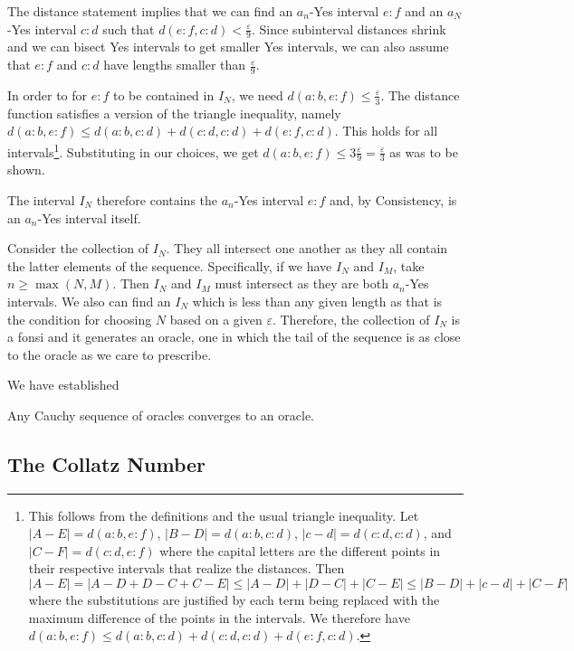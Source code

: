 \documentclass[12pt]{article}
\begin{document}
The distance statement implies that we can find an $a_n$-Yes interval $e:f$ and an $a_N$-Yes interval $c:d$ such that $d(e:f, c:d) < \frac{\varepsilon}{9}$. Since subinterval distances shrink and we can bisect Yes intervals to get smaller Yes intervals, we can also assume that $e:f$ and $c:d$ have lengths smaller than $\frac{\varepsilon}{9}$. 

In order to for $e:f$ to be contained in $I_N$, we need $d(a:b, e:f) \leq \frac{\varepsilon}{3}$. The distance function satisfies a version of the triangle inequality, namely $d(a:b, e:f) \leq d(a:b, c:d) + d(c:d, c:d) + d(e:f, c:d)$. This holds for all intervals\footnote{This follows from the definitions and the usual triangle inequality. Let $|A-E| = d(a:b, e:f)$, $|B-D| = d(a:b, c:d)$, $|c-d| = d(c:d, c:d)$, and $|C-F| = d(c:d, e:f)$ where the capital letters are the different points in their respective intervals that realize the distances. Then $|A-E| = |A - D + D - C + C - E| \leq |A-D| + |D-C| + |C-E| \leq |B-D| + |c-d| + |C-F|$ where the substitutions are justified by each term being replaced with the maximum difference of the points in the intervals.  We therefore have $d(a:b, e:f) \leq d(a:b, c:d) + d(c:d, c:d) + d(e:f, c:d)$.}. Substituting in our choices, we get $d(a:b, e:f) \leq 3 \frac{\varepsilon}{9} = \frac{\varepsilon}{3}$ as was to be shown. 

The interval $I_N$ therefore contains the $a_n$-Yes interval $e:f$ and, by Consistency, is an $a_n$-Yes interval itself. 

Consider the collection of $I_N$. They all intersect one another as they all contain the latter elements of the sequence. Specifically, if we have $I_N$ and $I_M$, take $n \geq \max(N, M)$. Then $I_N$ and $I_M$ must intersect as they are both $a_n$-Yes intervals. We also can find an $I_N$ which is less than any given length as that is the condition for choosing $N$ based on a given $\varepsilon$. Therefore, the collection of $I_N$ is a fonsi and it generates an oracle, one in which the tail of the sequence is as close to the oracle as we care to prescribe.     

We have established

\begin{theorem}\label{th:cauchy}
Any Cauchy sequence of oracles converges to an oracle. 
\end{theorem}



\subsection{The Collatz Number}
\end{document}
